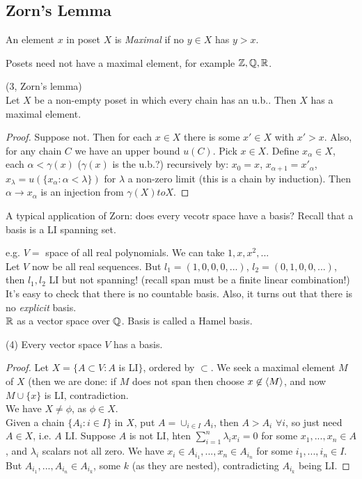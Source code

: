 \documentclass[a4paper]{article}
\begin{document}
\subsection{Zorn's Lemma}
An element $x$ in poset $X$ is \emph{Maximal} if no $y \in X$ has $y >x$.

Posets need not have a maximal element, for example $\mathbb{Z},\mathbb{Q},\mathbb{R}$.

\begin{thm} (3, Zorn's lemma)\\
Let $X$ be a non-empty poset in which every chain has an u.b.. Then $X$ has a maximal element.
\begin{proof}
Suppose not. Then for each $x \in X$ there is some $x' \in X$ with $x' > x$. Also, for any chain $C$ we have an upper bound $u(C)$. Pick $x \in X$. Define $x_\alpha \in X$, each $\alpha < \gamma(x)$ ($\gamma(x)$ is the u.b.?) recursively by: $x_0 = x$, $x_{\alpha+1} = x'_\alpha$, $x_\lambda = u(\{x_\alpha: \alpha < \lambda\})$ for $\lambda$ a non-zero limit (this is a chain by induction). Then $\alpha \to x_\alpha$ is an injection from $\gamma(X) to X$.
\end{proof}
\end{thm}

A typical application of Zorn: does every vecotr space have a basis? Recall that a basis is a LI spanning set.

e.g. $V=$ space of all real polynomials. We can take $1,x,x^2,...$\\
Let $V$ now be all real sequences. But $l_1 = (1,0,0,0,...)$, $l_2 = (0,1,0,0,...)$, then $l_1,l_2$ LI but not spanning! (recall span must be a finite linear combination!) It's easy to check that there is no countable basis. Also, it turns out that there is no \emph{explicit} basis.\\
$\mathbb{R}$ as a vector space over $\mathbb{Q}$. Basis is called a Hamel basis.

\begin{thm} (4)
Every vector space $V$ has a basis.
\begin{proof}
Let $X = \{A\subset V: A$ is LI$\}$, ordered by $\subset$. We seek a maximal element $M$ of $X$ (then we are done: if $M$ does not span then choose $x \not\in \langle M\rangle$, and now $M \cup \{x\}$ is LI, contradiction.\\
We have $X\neq\phi$, as $\phi \in X$.\\
Given a chain $\{A_i: i \in I\}$ in $X$, put $A = \cup_{i \in I} A_i$, then $A > A_i$ $\forall i$, so just need $A \in X$, i.e. $A$ LI. Suppose $A$ is not LI, hten $\sum_{i=1}^n \lambda_i x_i = 0$ for some $x_1,...,x_n \in A$, and $\lambda_i$ scalars not all zero. We have $x_i \in A_{i_1},...,x_n \in A_{i_n}$ for some $i_1,...,i_n \in I$. But $A_{i_1},...,A_{i_n} \in A_{i_k}$, some $k$ (as they are nested), contradicting $A_{i_k}$ being LI.
\end{proof}
\end{thm}
\end{document}
